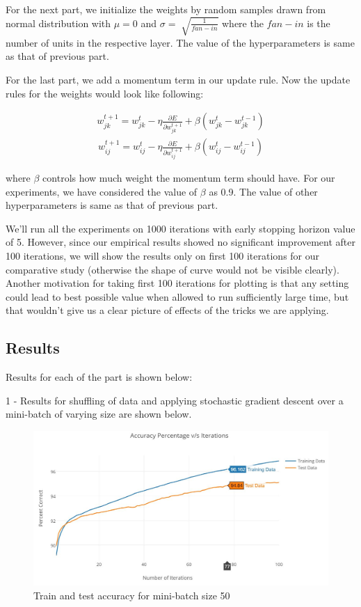 \documentclass{article}
\begin{document}
For the next part, we initialize the weights by random samples drawn from normal distribution with $\mu=0$ and $\sigma = \sqrt[]{\frac{1}{fan-in}}$ where the $fan-in$ is the number of units in the respective layer. The value of the hyperparameters is same as that of previous part.

For the last part, we add a momentum term in our update rule. Now the update rules for the weights would look like following:

\begin{align*}
w_{jk}^{t+1} = w_{jk}^{t} - \eta \frac{\partial E}{\partial w_{jk}^{t+1}} + \beta(w_{jk}^{t} - w_{jk}^{t-1})
\end{align*}
\begin{align*}
w_{ij}^{t+1} = w_{ij}^{t} - \eta \frac{\partial E}{\partial w_{ij}^{t+1}} + \beta(w_{ij}^{t} - w_{ij}^{t-1})
\end{align*}

where $\beta$ controls how much weight the momentum term should have. For our experiments, we have considered the value of $\beta$ as 0.9. The value of other hyperparameters is same as that of previous part.

We'll run all the experiments on 1000 iterations with early stopping horizon value of 5. However, since our empirical results showed no significant improvement after 100 iterations, we will show the results only on first 100 iterations for our comparative study (otherwise the shape of curve would not be visible clearly). Another motivation for taking first 100 iterations for plotting is that any setting could lead to best possible value when allowed to run sufficiently large time, but that wouldn't give us a clear picture of effects of the tricks we are applying.



\subsection{Results}

Results for each of the part is shown below:

1 - Results for shuffling of data and applying stochastic gradient descent over a mini-batch of varying size are shown below.

\pagebreak
\begin{figure}[h!]
  \centering
  \includegraphics[width=117mm]{graphs/Q4a_point1_50.JPG}
  \caption{Train and test accuracy for mini-batch size 50}
  \label{fig:4a_1}
\end{figure}
\end{document}
